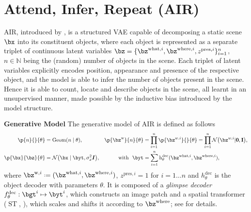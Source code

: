 \section{Attend, Infer, Repeat (AIR)}
\label{sec:air}

\gls{AIR}, introduced by \cite{Eslami2016air}, is a structured \gls{VAE} capable of decomposing a static scene $\bx$ into its constituent objects, where each object is represented as a separate triplet of continuous latent variables $\bz = \{\bz^{\mathrm{what}, i}, \bz^{\mathrm{where}, i}, z^{\mathrm{pres},i}\}_{i=1}^n$, $n \in \mathbb{N}$ being the (random) number of objects in the scene.
Each triplet of latent variables explicitly encodes position, appearance and presence of the respective object, and the model is able to infer the number of objects present in the scene. Hence it is able to count, locate and describe objects in the scene, all learnt in an unsupervised manner, made possible by the inductive bias introduced by the model structure.

\textbf{Generative Model}
The generative model of \gls{AIR} is defined as follows
\begin{align}
\label{eq:air_gen}
    \p{n}{}{\theta} &= \mathrm{Geom} (n \mid \theta), 
    &
    \p{\bz^{\mathrm{w}}}{n}{\theta} &= \prod_{i=1}^n \p{\bz^{w,i}}{}{\theta} = \prod_{i=1}^n \gauss{\bz^{w,i}|\bf{0}, \bf{I}},\nonumber \\
    \p{\bx}{\bz}{\theta} &= \gauss{\bx \mid \byt, \sigma^2_x \bm{I}}, 
    &\text{with}~~\byt &= \sum_{i=1}^n \operatorname{h}^\mathrm{dec}_\theta (
        \bz^{\mathrm{what}, i}, \bz^{\mathrm{where}, i}
    ),
\end{align}
where $\bz^{\mathrm{w},i} \defeq (\bz^{\mathrm{what}, i}, \bz^{\mathrm{where}, i})$, $z^{\mathrm{pres}, i}=1$ for $i=1 \ldots n$ and $h^\mathrm{dec}_\theta$ is the object decoder with parameters $\theta$.
It is composed of a \textit{glimpse decoder} $f_\theta^\mathrm{dec}: \bgt^i \mapsto \byt^i$,
which constructs an image patch and a 
spatial transformer ($\operatorname{ST}$, \cite{Jaderberg2015}), which scales and shifts it according to $\bz^\mathrm{where}$; see  for details.

